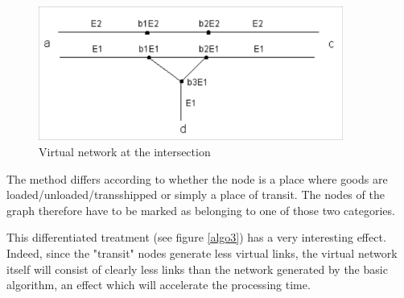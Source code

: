 \begin{figure}[htbp]
\centerline{\includegraphics[width=10cm]{f3_9.png}}
\caption{\label{f3_9}  Virtual network at the intersection}
\end{figure}


The method differs according to whether the node is a place where goods are
loaded/unloaded/transshipped or simply a place of transit.  The nodes of the
graph therefore have to be marked as belonging to one of those two categories.

This differentiated treatment (see figure \ref{algo3}) has a very interesting
effect. Indeed, since the "transit" nodes generate less virtual links, the
virtual network itself will consist of clearly less links than the network
generated by the basic algorithm, an effect which will accelerate the processing
time.


